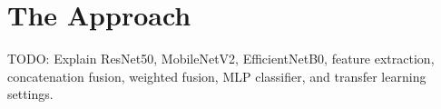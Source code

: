 \section{The Approach}

TODO: Explain ResNet50, MobileNetV2, EfficientNetB0, feature extraction, concatenation fusion, weighted fusion, MLP classifier, and transfer learning settings.
